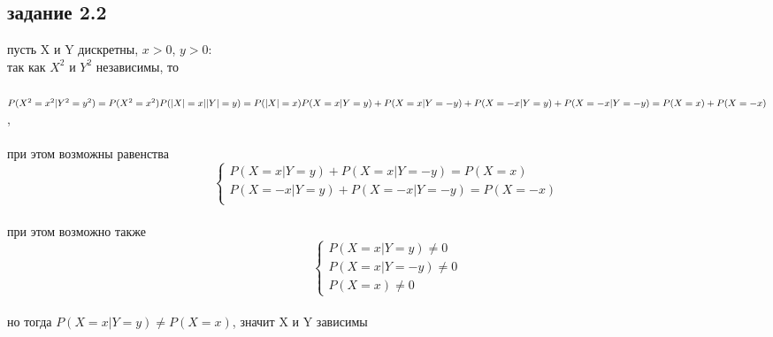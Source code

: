 \documentclass[a4paper]{article}
\begin{document}
\begin{large}
	\section*{задание 2.2}
	пусть X и Y дискретны, $x>0$, $y>0$:\\
	так как $X^2$ и $Y^2$ независимы, то\\\\
	$
	P(X^2=x^2|Y^2=y^2)=P(X^2=x^2)\\\\
	P(|X|=x||Y|=y)=P(|X|=x)\\\\
	P(X=x|Y=y)+P(X=x|Y=-y)+P(X=-x|Y=y)+\\P(X=-x|Y=-y)=P(X=x)+P(X=-x)
	$,\\\\
	при этом возможны равенства\\
	\[
	\left\{ \begin{array}{ll}
		P(X=x|Y=y)+P(X=x|Y=-y)=P(X=x)\\
		P(X=-x|Y=y)+P(X=-x|Y=-y)=P(X=-x)\\
	\end{array} \right.
	\]\\
	при этом возможно также\\
	\[
	\left\{ \begin{array}{ll}
		P(X=x|Y=y)\ne0\\
		P(X=x|Y=-y)\ne0\\
		P(X=x)\ne0
	\end{array} \right.
	\]\\
	но тогда $P(X=x|Y=y)\ne P(X=x)$, значит X и Y зависимы

\end{large}
\end{document}
